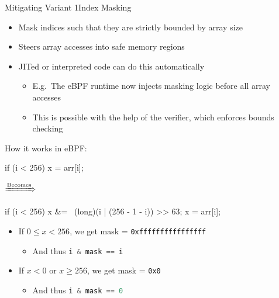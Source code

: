 \documentclass[10pt, dvipsnames, aspectratio=169]{beamer}
\let\lsi\lstinline
\newcommand{\code}[1]{\lsi[language=c]|#1|}
\begin{document}
\begin{frame}[c, fragile]{Mitigating Variant 1}{Index Masking}
  \begin{itemize}
    \item Mask indices such that they are strictly bounded by array size
    \item Steers array accesses into safe memory regions
    \item JITed or interpreted code can do this automatically
    \begin{itemize}
      \item E.g.~The eBPF runtime now injects masking logic before all array accesses
      \item This is possible with the help of the verifier, which enforces bounds checking
    \end{itemize}
  \end{itemize}

  \vfill
  How it works in eBPF:\\
  \hspace{6em}
  \begin{minipage}{8em}
    \begin{listing}[language=c,gobble=6]
      if (i < 256) {
          x = arr[i];
      }
    \end{listing}
  \end{minipage}
  $\xRightarrow{\text{Becomes}}$
  \hspace{2em}
  \begin{minipage}{12em}
    \begin{listing}[language=c,gobble=6]
      if (i < 256) {
          x &= ~(long)(i | (256 - 1 - i)) >> 63;
          x = arr[i];
      }
    \end{listing}
  \end{minipage}

  \vfill
  \begin{itemize}
    \item If $0 \le x < 256$, we get mask = \texttt{0xffffffffffffffff}
    \begin{itemize}
      \item And thus \code{i & mask == i}
    \end{itemize}
    \item If $x < 0$ or $x \ge 256$, we get mask = \texttt{0x0}
    \begin{itemize}
      \item And thus \code{i & mask == 0}
    \end{itemize}
  \end{itemize}
\end{frame}
\end{document}
